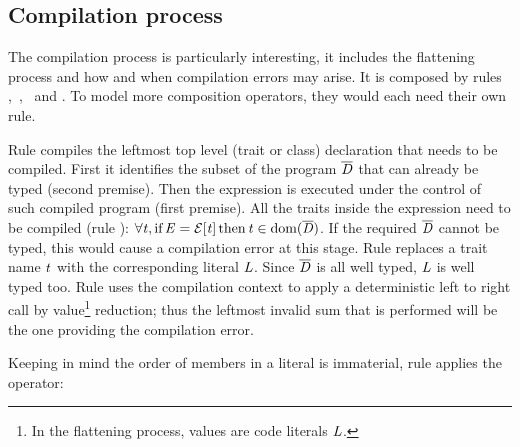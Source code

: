 \subsection{Compilation process}

The compilation process is particularly interesting,
it includes the flattening process and how and when compilation errors may arise.
It is composed by rules ,\ ,\  and .
To model more composition operators, they would each need their own rule.

Rule 
compiles the leftmost top level (trait or class) declaration that needs to be compiled.
First it identifies the subset of the program $\overline{\mathit{D}}$ that can already be typed (second premise).
Then the expression is executed under the control of such compiled program (first premise).
All the traits inside the expression need to
be compiled (rule ): $\forall\mathit{t}, \text{if}\, \mathit{E}={\mathcal{E}}[\mathit{t}]\,\text{then}\, \mathit{t}\in\text{dom}(\overline{\mathit{D}})$.
If the required $\overline{\mathit{D}}$ cannot be typed, this would cause a compilation error
at this stage.
Rule 
replaces a trait name $\mathit{t}$ with the corresponding literal $\mathit{L}$.
Since $\overline{\mathit{D}}$ is all well typed, $\mathit{L}$ is well typed too.
Rule 
uses the compilation context to apply a deterministic left to right call by value\footnote{
In the flattening process, values are code literals $\mathit{L}$.} reduction;
thus the leftmost invalid sum that is performed will be the one providing the compilation error.

Keeping in mind the order of members in a literal is immaterial, rule 
applies the operator:

